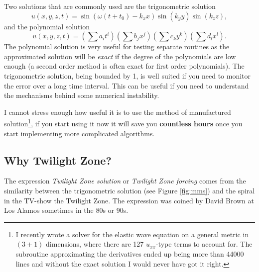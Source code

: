 \documentclass[]{amsart}
\begin{document}
Two solutions that are commonly used are the trigonometric solution
\[
u(x,y,z,t)= \sin(\omega (t+t_0) -k_x x) \sin( k_y y)\sin(k_z z),
\]
and the polynomial solution
\[
u(x,y,z,t)= \left(\sum a_i t^i \right) \left(\sum b_j x^j \right)\left(\sum c_k y^k \right)\left(\sum d_l x^l \right).
\]
The polynomial solution is very useful for testing separate routines as the approximated solution will be \emph{exact} if the degree of the polynomials are low enough (a second order method is often exact for first order polynomials).  
The trigonometric solution, being bounded by 1, is well suited if you need to monitor the error over a long time interval. This can be useful if you need to understand the mechanisms behind some numerical instability. 

I cannot stress enough how useful it is to use the method of manufactured solution\footnote{I recently wrote a solver for the elastic wave equation on a general metric in $(3+1)$ dimensions, where there are 127 $u_{xx}$-type terms to account for. The subroutine approximating the derivatives ended up being more than 44000 lines and without the exact solution I would never have got it right.}, if you start using it now it will save you {\bf countless hours} once you start implementing more complicated algorithms.




\subsection*{Why Twilight Zone?}
The expression \emph{Twilight Zone solution} or \emph{Twilight Zone forcing} comes from the similarity between the trigonometric solution (see Figure \ref{fig:mms}) and the spiral in the TV-show the Twilight Zone. The expression was coined by David Brown at Los Alamos sometimes in the 80s or 90s.   
\end{document}
